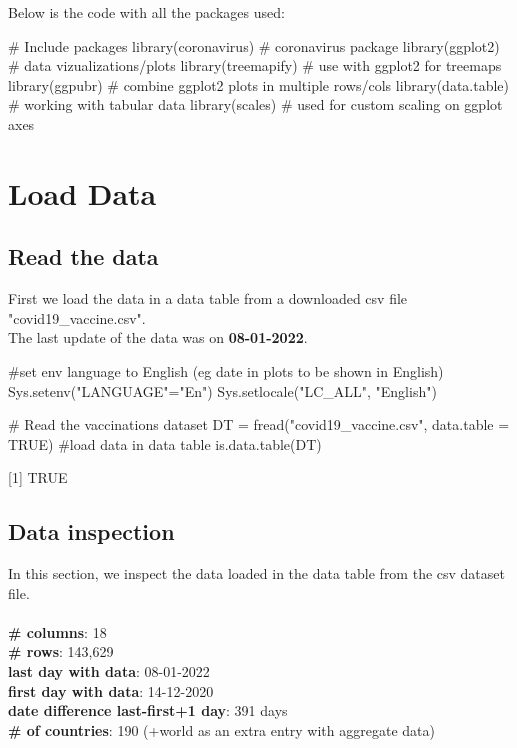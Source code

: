 Below is the code with all the packages used:
\begin{Rcode}{\scriptsize}
# Include packages
library(coronavirus) # coronavirus package
library(ggplot2) # data vizualizations/plots
library(treemapify) # use with ggplot2 for treemaps
library(ggpubr) # combine ggplot2 plots in multiple rows/cols
library(data.table) # working with tabular data
library(scales) # used for custom scaling on ggplot axes
\end{Rcode}


\section{Load Data}
\subsection{Read the data}
First we load the data in a data table from a downloaded csv file "covid19\_vaccine.csv".
\\
The last update of the data was on \textbf{08-01-2022}.

\begin{Rcode}{\scriptsize}
#set env language to English (eg date in plots to be shown in English)
Sys.setenv("LANGUAGE"="En")
Sys.setlocale("LC_ALL", "English")

# Read the vaccinations dataset
DT = fread("covid19_vaccine.csv", data.table = TRUE) #load data in data table
is.data.table(DT)
\end{Rcode}
[1] TRUE

\subsection{Data inspection}
In this section, we inspect the data loaded in the data table from the csv dataset file.
\\ \\
\textbf{\# columns}: 18
\\
\textbf{\# rows}: 143,629
\\
\textbf{last day with data}: 08-01-2022
\\
\textbf{first day with data}: 14-12-2020
\\
\textbf{date difference last-first+1 day}: 391 days
\\
\textbf{\# of countries}: 190 (+world as an extra entry with aggregate data)

